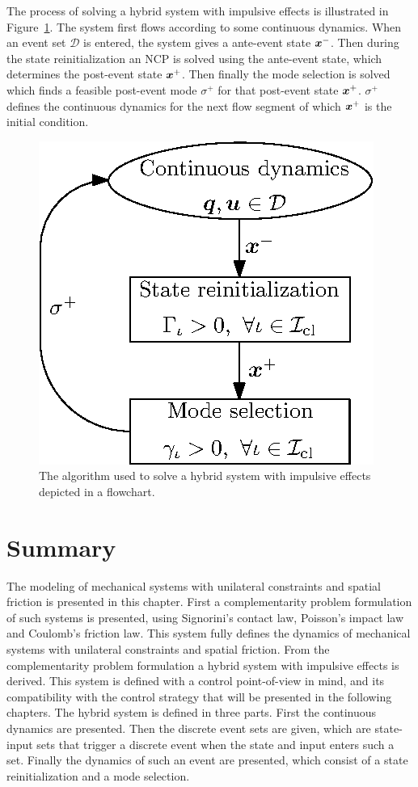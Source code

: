 \documentclass[../DC2017114Bouma.tex]{subfiles}
\begin{document}
The process of solving a hybrid system with impulsive effects is illustrated in Figure~\ref{fig:2hybridalg}. The system first flows according to some continuous dynamics. When an event set $\mathcal{D}$ is entered, the system gives a ante-event state ${\boldsymbol{x}}^-$. Then during the state reinitialization an NCP is solved using the ante-event state, which determines the post-event state ${\boldsymbol{x}}^+$. Then finally the mode selection is solved which finds a feasible post-event mode $\sigma^+$ for that post-event state ${\boldsymbol{x}}^+$. $\sigma^+$ defines the continuous dynamics for the next flow segment of which ${\boldsymbol{x}}^+$ is the initial condition.

\begin{figure}[h]
\centering
\includegraphics[width=.35\textwidth]{hybridalg.eps}\caption{The algorithm used to solve a hybrid system with impulsive effects depicted in a flowchart.} \label{fig:2hybridalg}
\end{figure}

\section{Summary}
The modeling of mechanical systems with unilateral constraints and spatial friction is presented in this chapter. First a complementarity problem formulation of such systems is presented, using Signorini's contact law, Poisson's impact law and Coulomb's friction law. This system fully defines the dynamics of mechanical systems with unilateral constraints and spatial friction. From the complementarity problem formulation a hybrid system with impulsive effects is derived. This system is defined with a control point-of-view in mind, and its compatibility with the control strategy that will be presented in the following chapters. The hybrid system is defined in three parts. First the continuous dynamics are presented. Then the discrete event sets are given, which are state-input sets that trigger a discrete event when the state and input enters such a set. Finally the dynamics of such an event are presented, which consist of a state reinitialization and a mode selection.
\end{document}
